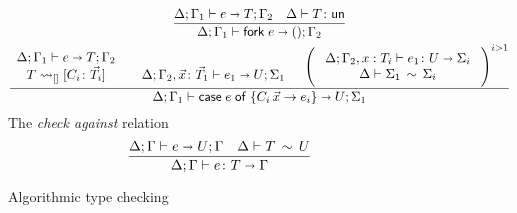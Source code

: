 \begin{figure}[h!]
\begin{gather*}
  \frac{
    \algtypeout[\kindEnv;\varEnv_1]{e}{T}{\varEnv_2}
    \quad
    \isUn T
  }{
    \algtypeout[\kindEnv;\varEnv_1]{\forke{e}}{\unite}{\varEnv_2}
  }
  \\
  \frac{
    \begin{array}{c}
      \algtypeout[\kindEnv;\varEnv_1]{e}{T}{\varEnv_2}\\
      T \Extract{[]}[C_i\colon\vec T_i]\\
    \end{array}
    \quad
    \begin{array}{c}\\
      \algtypeout[\kindEnv;\varEnv_2, \vec x\colon\vec T_1]{e_1}{U}{\Sigma_1}
    \end{array}
    \quad
    \Bigg(\;\begin{array}{c}
              \algtypein[\kindEnv;\varEnv_2,x:T_i]{e_1}{U}{\Sigma_i}\\
              \ctxequiv{\Sigma_1}{\Sigma_i} 
            \end{array}
            \;\Bigg)^{i>1}
          }{
            \algtypeout[\kindEnv;\varEnv_1]{\casee{e}{\{C_i\,\vec x\rightarrow e_i\}}}{U}{\Sigma_1}
          }
  \end{gather*}
  The \emph{check against} relation\hfill{}
  \begin{gather*}
    \frac{
      \algtypeout e U \varEnv
      \quad
      \typeequiv T U
    }{
      \algtypein e T \varEnv
    }
  \end{gather*}
  \caption{Algorithmic type checking}
  \label{fig:alg-typing}
\end{figure}

